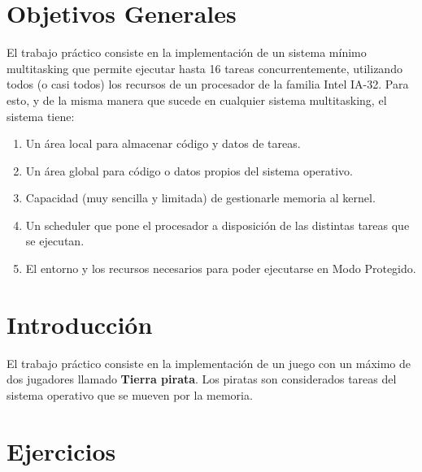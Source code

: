 \documentclass[a4paper,10pt]{article}
\begin{document}
\thispagestyle{empty}

\maketitle
\newpage

\section{Objetivos Generales}
El trabajo práctico consiste en la implementación de un sistema mínimo multitasking que permite ejecutar hasta 16 tareas concurrentemente, utilizando todos (o casi todos) los recursos de un procesador de la familia Intel IA-32. Para esto, y de la misma manera que sucede en cualquier sistema multitasking, el sistema tiene:
\begin{enumerate}
  \item Un área local para almacenar código y datos de tareas.
  \item Un área global para código o datos propios del sistema operativo.
  \item Capacidad (muy sencilla y limitada) de gestionarle memoria al kernel.
  \item Un scheduler que pone el procesador a disposición de las distintas tareas que se ejecutan.
  \item El entorno y los recursos necesarios para poder ejecutarse en Modo Protegido.
\end{enumerate}

\section{Introducción}
El trabajo práctico consiste en la implementación de un juego con un máximo de dos jugadores llamado \textbf{Tierra pirata}.
Los piratas son considerados tareas del sistema operativo que se mueven por la memoria.

\section{Ejercicios}
\end{document}
